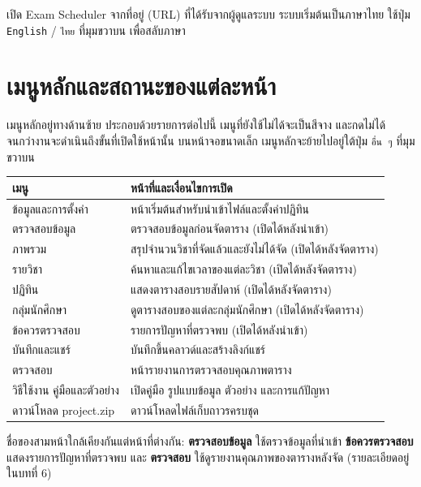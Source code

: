
\noindent เปิด Exam Scheduler จากที่อยู่ (URL) ที่ได้รับจากผู้ดูแลระบบ
ระบบเริ่มต้นเป็นภาษาไทย ใช้ปุ่ม \texttt{English} / \texttt{ไทย} ที่มุมขวาบน
เพื่อสลับภาษา

\section{เมนูหลักและสถานะของแต่ละหน้า}

เมนูหลักอยู่ทางด้านซ้าย ประกอบด้วยรายการต่อไปนี้ เมนูที่ยังใช้ไม่ได้จะเป็นสีจาง
และกดไม่ได้ จนกว่างานจะดำเนินถึงขั้นที่เปิดใช้หน้านั้น บนหน้าจอขนาดเล็ก
เมนูหลักจะย้ายไปอยู่ใต้ปุ่ม \texttt{อื่น ๆ} ที่มุมขวาบน

\begin{longtable}{L{4cm}L{9.5cm}}
\toprule
\textbf{เมนู} & \textbf{หน้าที่และเงื่อนไขการเปิด} \\
\midrule
ข้อมูลและการตั้งค่า & หน้าเริ่มต้นสำหรับนำเข้าไฟล์และตั้งค่าปฏิทิน \\
ตรวจสอบข้อมูล & ตรวจสอบข้อมูลก่อนจัดตาราง (เปิดได้หลังนำเข้า) \\
ภาพรวม & สรุปจำนวนวิชาที่จัดแล้วและยังไม่ได้จัด (เปิดได้หลังจัดตาราง) \\
รายวิชา & ค้นหาและแก้ไขเวลาของแต่ละวิชา (เปิดได้หลังจัดตาราง) \\
ปฏิทิน & แสดงตารางสอบรายสัปดาห์ (เปิดได้หลังจัดตาราง) \\
กลุ่มนักศึกษา & ดูตารางสอบของแต่ละกลุ่มนักศึกษา (เปิดได้หลังจัดตาราง) \\
ข้อควรตรวจสอบ & รายการปัญหาที่ตรวจพบ (เปิดได้หลังนำเข้า) \\
บันทึกและแชร์ & บันทึกขึ้นคลาวด์และสร้างลิงก์แชร์ \\
ตรวจสอบ & หน้ารายงานการตรวจสอบคุณภาพตาราง \\
วิธีใช้งาน คู่มือและตัวอย่าง & เปิดคู่มือ รูปแบบข้อมูล ตัวอย่าง และการแก้ปัญหา \\
ดาวน์โหลด project.zip & ดาวน์โหลดไฟล์เก็บถาวรครบชุด \\
\bottomrule
\end{longtable}

ชื่อของสามหน้าใกล้เคียงกันแต่หน้าที่ต่างกัน: \textbf{ตรวจสอบข้อมูล}
ใช้ตรวจข้อมูลที่นำเข้า \textbf{ข้อควรตรวจสอบ} แสดงรายการปัญหาที่ตรวจพบ
และ \textbf{ตรวจสอบ} ใช้ดูรายงานคุณภาพของตารางหลังจัด
(รายละเอียดอยู่ในบทที่ 6)


